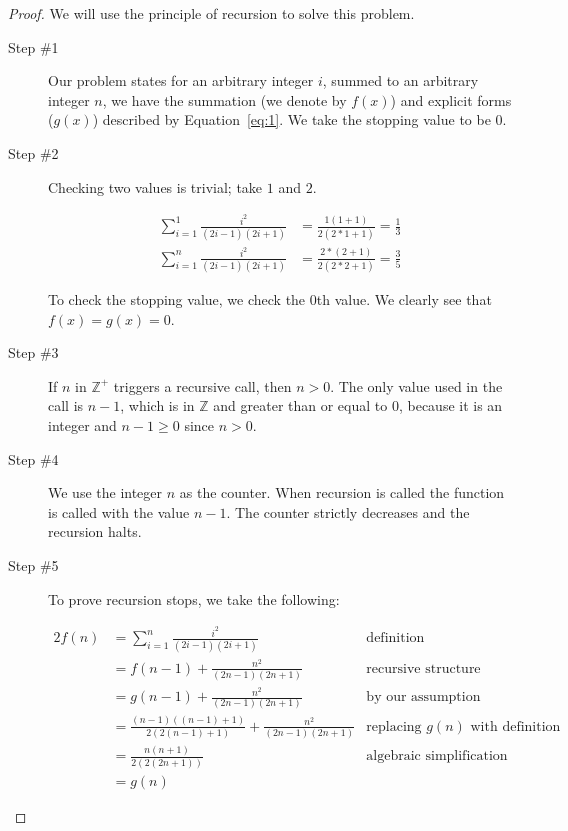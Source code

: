 \documentclass[12pt]{scrartcl}
\begin{document}
\begin{proof}
    We will use the principle of recursion to solve this problem.

    \begin{description}
        \item[Step \#1] Our problem states for an arbitrary integer $i$, summed to an arbitrary integer $n$, we have the summation (we denote by $f(x)$) and explicit forms ($g(x)$) described by Equation~\ref{eq:1}. We take the stopping value to be $0$.
        \item[Step \#2] Checking two values is trivial; take $1$ and $2$.

            \begin{align*}
                \sum_{i = 1} ^{1} \frac{i^2}{(2i -1)(2i + 1)} &= \frac{1(1 + 1)}{2(2*1 + 1)} = \frac{1}{3} \\
                \sum_{i = 1} ^{n} \frac{i^2}{(2i -1)(2i + 1)} &= \frac{2*(2 + 1)}{2(2*2 + 1)} = \frac{3}{5}
            \end{align*}

            To check the stopping value, we check the $0$th value. We clearly see that $f(x) = g(x) = 0$.

        \item[Step \#3] If $n$ in $\mathbb{Z}^+$ triggers a recursive call, then $n > 0$. The only value used in the call is $n - 1$, which is in $\mathbb{Z}$ and greater than or equal to $0$, because it is an integer and $n − 1 \geq 0$ since $n > 0$.

        \item[Step \#4] We use the integer $n$ as the counter. When recursion is called the function is called with the value $n - 1$. The counter strictly decreases and the recursion halts.

        \item[Step \#5] To prove recursion stops, we take the following:

            \begin{alignat*}{2}
                f(n) &= \sum_{i = 1} ^{n} \frac{i^2}{(2i -1)(2i + 1)} &\text{definition}\\
                     &= f(n-1) + \frac{n^2}{(2n -1)(2n + 1)}          &\text{recursive structure}\\
                     &= g(n-1) + \frac{n^2}{(2n -1)(2n + 1)}          &\text{by our assumption}\\
                     &= \frac{(n - 1)((n-1) + 1)}{2(2(n - 1) + 1)} + \frac{n^2}{(2n -1)(2n + 1)} & \text{replacing $g(n)$ with definition} \\
                     &= \frac{n(n + 1)}{2(2(2n + 1))}                 &\text{algebraic simplification} \\
                     &= g(n)
            \end{alignat*}


\end{description}
\end{proof}
\end{document}
